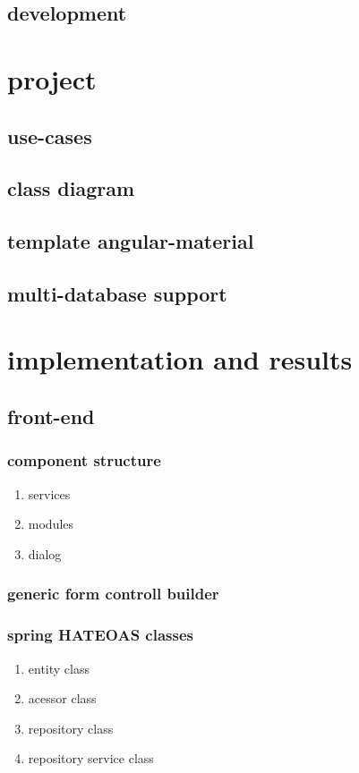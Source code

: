 \documentclass[11pt]{article}
\begin{document}
\subsection{development}
\label{sec:orgbb9b7d6}

\section{project}
\label{sec:org016d66b}
\subsection{use-cases}
\label{sec:orgfa8c796}
\subsection{class diagram}
\label{sec:org12f63fa}
\subsection{template angular-material}
\label{sec:org41fcc57}
\subsection{multi-database support}
\label{sec:orgfd5125d}

\section{implementation and results}
\label{sec:orgd2dd03a}
\subsection{front-end}
\label{sec:orgabeaced}
\subsubsection{component structure}
\label{sec:orgd9b86b2}
\begin{enumerate}
\item services
\label{sec:org3a2a962}
\item modules
\label{sec:orgcfb9bae}
\item dialog
\label{sec:orgaf2a971}
\end{enumerate}
\subsubsection{generic form controll builder}
\label{sec:org32aad85}
\subsubsection{spring HATEOAS classes}
\label{sec:org615722b}
\begin{enumerate}
\item entity class
\label{sec:orgc946469}
\item acessor class
\label{sec:org859b8ff}
\item repository class
\label{sec:orgecc7c1c}
\item repository service class
\label{sec:org8057b7b}
\end{enumerate}
\end{document}
